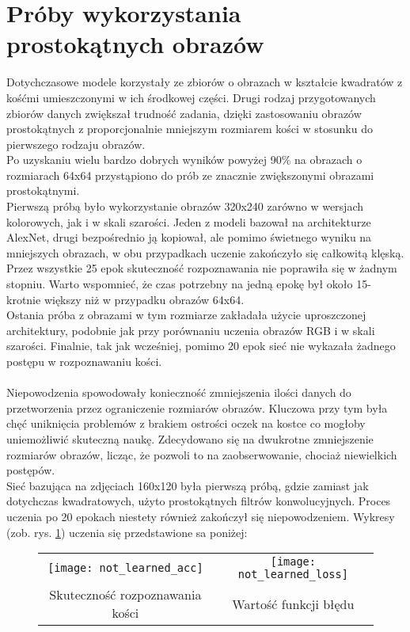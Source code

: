 \section{Próby wykorzystania prostokątnych obrazów}
Dotychczasowe modele korzystały ze zbiorów o obrazach w kształcie kwadratów z kośćmi
umieszczonymi w ich środkowej części. Drugi rodzaj przygotowanych zbiorów danych zwiększał
trudność zadania, dzięki zastosowaniu obrazów prostokątnych z proporcjonalnie mniejszym
rozmiarem kości w stosunku do pierwszego rodzaju obrazów.\\
Po uzyskaniu wielu bardzo dobrych wyników powyżej 90\% na obrazach o rozmiarach 64x64
przystąpiono do prób ze znacznie zwiększonymi obrazami prostokątnymi.\\
Pierwszą próbą było wykorzystanie obrazów 320x240 zarówno w wersjach kolorowych, jak i w skali szarości.
Jeden z modeli bazował na architekturze AlexNet, drugi bezpośrednio
ją kopiował, ale pomimo świetnego wyniku na mniejszych obrazach, w obu przypadkach
uczenie zakończyło się całkowitą klęską. Przez wszystkie 25 epok skuteczność rozpoznawania
nie poprawiła się w żadnym stopniu. Warto wspomnieć, że czas potrzebny na
jedną epokę był około 15-krotnie większy niż w przypadku obrazów 64x64.\\
Ostania próba z obrazami w tym rozmiarze zakładała użycie uproszczonej architektury,
podobnie jak przy porównaniu uczenia obrazów RGB i w skali szarości. Finalnie, tak jak
wcześniej, pomimo 20 epok sieć nie wykazała żadnego postępu w rozpoznawaniu kości.\\\\
Niepowodzenia spowodowały konieczność zmniejszenia ilości danych do przetworzenia przez ograniczenie rozmiarów obrazów.
Kluczowa przy tym była chęć uniknięcia problemów z brakiem ostrości
oczek na kostce co mogłoby uniemożliwić skuteczną naukę. Zdecydowano się na dwukrotne
zmniejszenie rozmiarów obrazów, licząc, że pozwoli to na zaobserwowanie, chociaż niewielkich
postępów.\\
Sieć bazująca na zdjęciach 160x120 była pierwszą próbą, gdzie zamiast jak dotychczas
kwadratowych, użyto prostokątnych filtrów konwolucyjnych. Proces uczenia po 20 epokach
niestety również zakończył się niepowodzeniem. Wykresy (zob. rys. \ref{fig:not_learned}) uczenia się przedstawione sa poniżej: \newpage

\begin{figure}[h!]
\begin{center}
\begin{tabular}{cc}
\texttt{[image: not\_learned\_acc]} &
\texttt{[image: not\_learned\_loss]} \\
 Skuteczność rozpoznawania kości & Wartość funkcji błędu\\
\end{tabular}
\label{fig:not_learned}
\end{center}
\end{figure}

